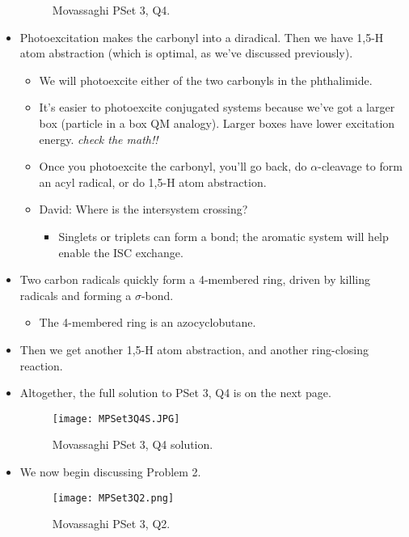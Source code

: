 \documentclass[../notes.tex]{subfiles}
\begin{document}
\begin{itemize}
\begin{figure}[h!]
        \caption{Movassaghi PSet 3, Q4.}
        \label{fig:MPSet3Q4}
    \end{figure}
    \item Photoexcitation makes the carbonyl into a diradical. Then we have 1,5-H atom abstraction (which is optimal, as we've discussed previously).
    \begin{itemize}
        \item We will photoexcite either of the two carbonyls in the phthalimide.
        \item It's easier to photoexcite conjugated systems because we've got a larger box (particle in a box QM analogy). Larger boxes have lower excitation energy. \emph{check the math!!}
        \item Once you photoexcite the carbonyl, you'll go back, do $\alpha$-cleavage to form an acyl radical, or do 1,5-H atom abstraction.
        \item David: Where is the intersystem crossing?
        \begin{itemize}
            \item Singlets or triplets can form a bond; the aromatic system will help enable the ISC exchange.
        \end{itemize}
    \end{itemize}
    \item Two carbon radicals quickly form a 4-membered ring, driven by killing radicals and forming a  $\sigma$-bond.
    \begin{itemize}
        \item The 4-membered ring is an azocyclobutane.
    \end{itemize}
    \item Then we get another 1,5-H atom abstraction, and another ring-closing reaction.
    \item Altogether, the full solution to PSet 3, Q4 is on the next page.
    \begin{figure}[H]
        \centering
        \texttt{[image: MPSet3Q4S.JPG]}
        \caption{Movassaghi PSet 3, Q4 solution.}
        \label{fig:MPSet3Q4S}
    \end{figure}
    \pagebreak
    \item We now begin discussing Problem 2.
    \begin{figure}[h!]
        \centering
        \texttt{[image: MPSet3Q2.png]}
        \caption{Movassaghi PSet 3, Q2.}
        \label{fig:MPSet3Q2}
    \end{figure}

\end{itemize}
\end{document}
